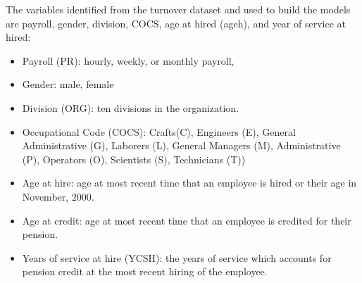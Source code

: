 \documentclass[12pt,letterpaper]{article}
\begin{document}
The variables identified from the turnover dataset and used to build the models are payroll, gender, division, COCS, age at hired (ageh),  and year of service at hired:
\begin{itemize}
	\item Payroll (PR): hourly, weekly, or monthly payroll,
	\item Gender: male, female
	\item Division (ORG): ten divisions in the organization.
	\item Occupational Code (COCS): Crafts(C), Engineers (E), General Administrative (G), Laborers (L), General Managers (M),  Administrative (P),  Operators (O), Scientists (S), Technicians (T))
	\item Age at hire: age at most recent time that an employee is hired or their age in November, 2000.
	\item Age at credit: age at most recent time that an employee is credited for their pension.
	\item Years of service at hire (YCSH): the years of service which accounts for pension credit at the most recent hiring of the employee.
	
\end{itemize}
\end{document}
